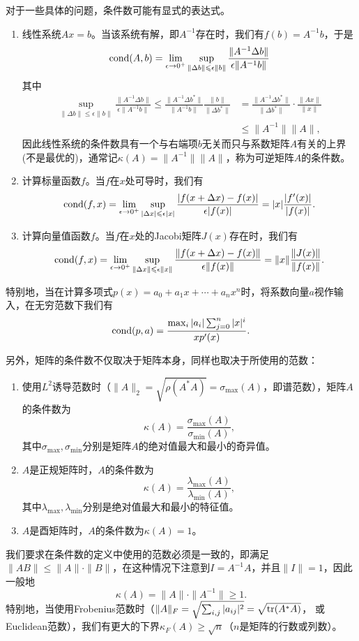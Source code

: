 \documentclass[a4paper,10pt]{ctexart}
\begin{document}
对于一些具体的问题，条件数可能有显式的表达式。
\begin{enumerate}
    \item 线性系统$ Ax = b $。当该系统有解，即$ A^{-1} $存在时，我们有$ f(b) = A^{-1}b $，于是
    \[
        {\rm cond}(A,b) = \lim_{\epsilon\to 0^+} \sup_{\| \Delta b \|\leqslant \epsilon \| b \| }\frac{\| A^{-1}\Delta b\| }{\epsilon \| A^{-1}b \| }
    \]
    其中
    \[
        \begin{aligned}
            \sup_{\| \Delta b \|\leqslant \epsilon \| b \| }\frac{\| A^{-1}\Delta b\| }{\epsilon \| A^{-1}b \| } \leqslant \frac{\| A^{-1} \Delta b^*\| }{\| A^{-1} b \| } \frac{\| b \|}{\| \Delta b^* \| } &= \frac{\| A^{-1} \Delta b^* \|}{\| \Delta b^* \| }\cdot \frac{\| Ax \|}{\| x \| }\\
            &\leqslant \| A^{-1} \| \| A \|,
        \end{aligned}
    \]
    因此线性系统的条件数具有一个与右端项$ b $无关而只与系数矩阵$ A $有关的上界(不是最优的)，通常记$ \kappa(A) = \| A^{-1} \| \| A \| $，称为可逆矩阵$ A $的条件数。
    \item 计算标量函数$ f $。当$ f $在$ x $处可导时，我们有
    \[
        {\rm cond}(f,x) = \lim_{\epsilon\to 0^+} \sup_{|\Delta x|\leqslant \epsilon |x| }\frac{|f(x+\Delta x) - f(x)|}{\epsilon |f(x)|} = |x| \frac{|f'(x)|}{|f(x)|}.  
    \]
    \item 计算向量值函数$ f $。当$ f $在$ x $处的Jacobi矩阵$ J(x) $存在时，我们有
    \[
        {\rm cond}(f,x) = \lim_{\epsilon\to 0^+} \sup_{\| \Delta x \| \leqslant \epsilon \| x \| }\frac{\| f(x+\Delta x) - f(x) \|}{\epsilon \| f(x) \|} = \| x \| \frac{\| J(x) \|}{\| f(x)\| }.
    \]
\end{enumerate}
特别地，当在计算多项式$ p(x) = a_0 + a_1 x +\cdots+ a_n x^n $时，将系数向量$ a $视作输入，在无穷范数下我们有
\[
    {\rm cond}(p,a) = \frac{\max_i |a_i| \sum_{j=0}^n |x|^i}{x p'(x)}.
\]

另外，矩阵的条件数不仅取决于矩阵本身，同样也取决于所使用的范数：
\begin{enumerate}
    \item 使用$ L^2 $诱导范数时（$ \| A \|_2 = \sqrt{\rho(A^*A)} = \sigma_{\max}(A) $，即谱范数），矩阵$ A $的条件数为
    \[
        \kappa(A) = \frac{\sigma_{\max}(A)}{\sigma_{\min}(A)},
    \]
    其中$ \sigma_{\max},\sigma_{\min} $分别是矩阵$ A $的绝对值最大和最小的奇异值。
    \item $ A $是正规矩阵时，$ A $的条件数为
    \[
        \kappa(A) = \frac{\lambda_{\max}(A)}{\lambda_{\min}(A)},
    \]
    其中$ \lambda_{\max},\lambda_{\min} $分别是绝对值最大和最小的特征值。
    \item $ A $是酉矩阵时，$ A $的条件数为$ \kappa(A)=1 $。
\end{enumerate}
我们要求在条件数的定义中使用的范数必须是一致的，即满足$ \| AB \| \leqslant \| A \| \cdot \| B \| $，在这种情况下注意到$ I = A^{-1}A $，并且$ \| I \| = 1 $，因此一般地
\begin{equation}
    \kappa(A) = \| A \| \cdot \| A^{-1} \|\geqslant 1.
\end{equation}
特别地，当使用Frobenius范数时（$ \| A \|_F = \sqrt{\sum_{i,j}|a_{ij}|^2} = \sqrt{{\rm tr} (A^*A)} $， 或Euclidean范数），我们有更大的下界$ \kappa_F(A)\geqslant \sqrt{n} $（$ n $是矩阵的行数或列数）。
\end{document}
